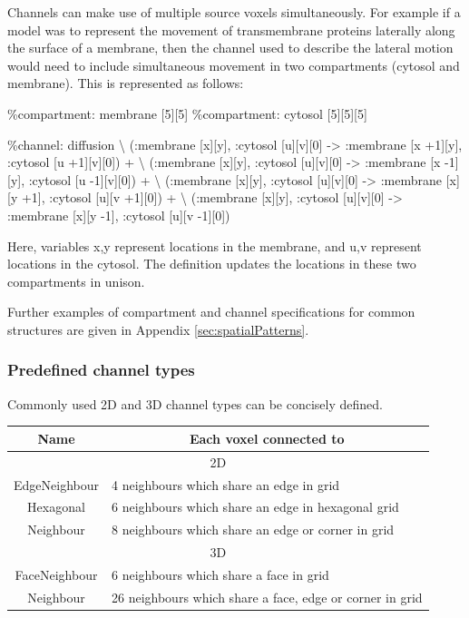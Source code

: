 Channels can make use of multiple source voxels simultaneously. For example if a model was to represent the movement of transmembrane proteins laterally along the surface of a membrane, then the channel used to describe the lateral motion would need to include simultaneous movement in two compartments (cytosol and membrane). This is represented as follows:

\begin{kappasource}
\%compartment: membrane [5][5]
\%compartment: cytosol [5][5][5]

\%channel: diffusion {\textbackslash}
    (:membrane [x][y], :cytosol [u][v][0] -> :membrane [x +1][y], :cytosol [u +1][v][0]) + {\textbackslash}
    (:membrane [x][y], :cytosol [u][v][0] -> :membrane [x -1][y], :cytosol [u -1][v][0]) + {\textbackslash}
    (:membrane [x][y], :cytosol [u][v][0] -> :membrane [x][y +1], :cytosol [u][v +1][0]) + {\textbackslash}
    (:membrane [x][y], :cytosol [u][v][0] -> :membrane [x][y -1], :cytosol [u][v -1][0])
\end{kappasource}

Here, variables x,y represent locations in the membrane, and u,v represent locations in the cytosol. The definition updates the locations in these two compartments in unison.

Further examples of compartment and channel specifications for common structures are given in Appendix
 \ref{sec:spatialPatterns}.

\subsubsection{Predefined channel types}

Commonly used 2D and 3D channel types can be concisely defined. 

\medskip 

\begin{tabular}{|c|l|}
\hline
Name & \multicolumn{1}{|c|}{Each voxel connected to}\\ 
\hline
\multicolumn{2}{|c|}{2D}\\
\hline
EdgeNeighbour & 4 neighbours which share an edge in grid \\
Hexagonal & 6 neighbours which share an edge in hexagonal grid \\
Neighbour & 8 neighbours which share an edge or corner in grid \\
\hline
\multicolumn{2}{|c|}{3D}\\
\hline
FaceNeighbour & 6 neighbours which share a face in grid\\
Neighbour & 26 neighbours which share a face, edge or corner in grid \\
\hline
\end{tabular} 

